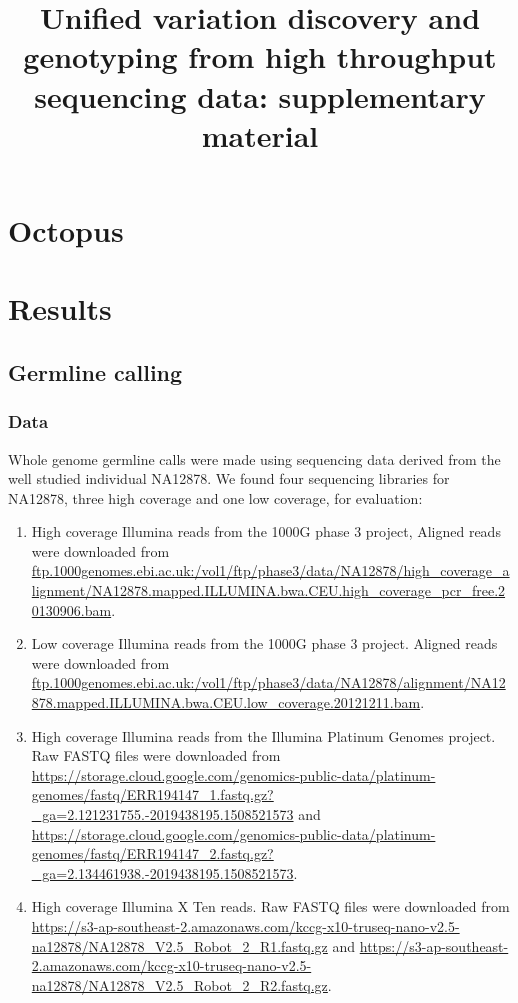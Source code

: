 \documentclass{article}
\title{Unified variation discovery and genotyping from high throughput sequencing data: supplementary material}
\author{}
\date{}
\begin{document}
\maketitle

\tableofcontents

\section{Octopus}

\section{Results}

\subsection{Germline calling}

\subsubsection{Data}

Whole genome germline calls were made using sequencing data derived from the well studied individual NA12878. We found four sequencing libraries for NA12878, three high coverage and one low coverage, for evaluation:

\begin{enumerate}
    \item High coverage Illumina reads from the 1000G phase 3 project, Aligned reads were downloaded from \url{ftp.1000genomes.ebi.ac.uk:/vol1/ftp/phase3/data/NA12878/high_coverage_alignment/NA12878.mapped.ILLUMINA.bwa.CEU.high_coverage_pcr_free.20130906.bam}.
    \item Low coverage Illumina reads from the 1000G phase 3 project. Aligned reads were downloaded from \url{ftp.1000genomes.ebi.ac.uk:/vol1/ftp/phase3/data/NA12878/alignment/NA12878.mapped.ILLUMINA.bwa.CEU.low_coverage.20121211.bam}.
    \item High coverage Illumina reads from the Illumina Platinum Genomes project. Raw FASTQ files were downloaded from \url{https://storage.cloud.google.com/genomics-public-data/platinum-genomes/fastq/ERR194147_1.fastq.gz?_ga=2.121231755.-2019438195.1508521573} and \url{https://storage.cloud.google.com/genomics-public-data/platinum-genomes/fastq/ERR194147_2.fastq.gz?_ga=2.134461938.-2019438195.1508521573}.
    \item High coverage Illumina X Ten reads. Raw FASTQ files were downloaded from \url{https://s3-ap-southeast-2.amazonaws.com/kccg-x10-truseq-nano-v2.5-na12878/NA12878_V2.5_Robot_2_R1.fastq.gz} and \url{https://s3-ap-southeast-2.amazonaws.com/kccg-x10-truseq-nano-v2.5-na12878/NA12878_V2.5_Robot_2_R2.fastq.gz}.
\end{enumerate}
\end{document}
